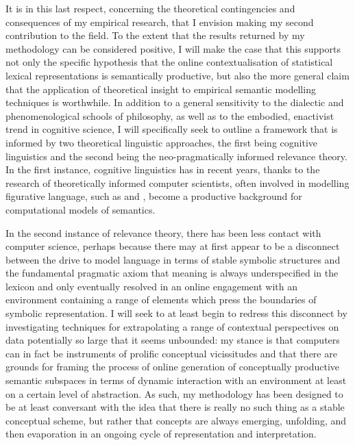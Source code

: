 It is in this last respect, concerning the theoretical contingencies and consequences of my empirical research, that I envision making my second contribution to the field.  To the extent that the results returned by my methodology can be considered positive, I will make the case that this supports not only the specific hypothesis that the online contextualisation of statistical lexical representations is semantically productive, but also the more general claim that the application of theoretical insight to empirical semantic modelling techniques is worthwhile.  In addition to a general sensitivity to the dialectic and phenomenological schools of philosophy, as well as to the embodied, enactivist trend in cognitive science, I will specifically seek to outline a framework that is informed by two theoretical linguistic approaches, the first being cognitive linguistics and the second being the neo-pragmatically informed relevance theory.  In the first instance, cognitive linguistics has in recent years, thanks to the research of theoretically informed computer scientists, often involved in modelling figurative language, such as \cite{Barnden2008} and \cite{ShutovaEA2013}, become a productive background for computational models of semantics.

In the second instance of relevance theory, there has been less contact with computer science, perhaps because there may at first appear to be a disconnect between the drive to model language in terms of stable symbolic structures and the fundamental pragmatic axiom that meaning is always underspecified in the lexicon and only eventually resolved in an online engagement with an environment containing a range of elements which press the boundaries of symbolic representation.  I will seek to at least begin to redress this disconnect by investigating techniques for extrapolating a range of contextual perspectives on data potentially so large that it seems unbounded: my stance is that computers can in fact be instruments of prolific conceptual vicissitudes and that there are grounds for framing the process of online generation of conceptually productive semantic subspaces in terms of dynamic interaction with an environment at least on a certain level of abstraction.  As such, my methodology has been designed to be at least conversant with the idea that there is really no such thing as a stable conceptual scheme, but rather that concepts are always emerging, unfolding, and then evaporation in an ongoing cycle of representation and interpretation.

